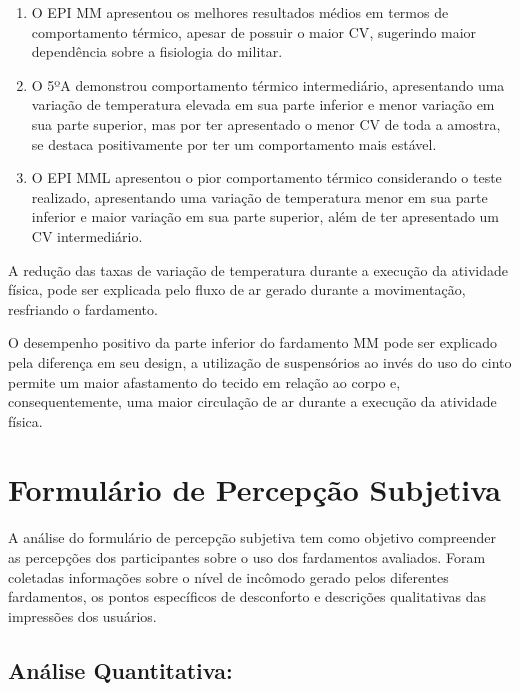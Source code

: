         \begin{enumerate}[label=\Roman*.] %
            \item O \acrshort{EPI} \acrlong{MM} apresentou os melhores resultados médios em termos de 
            comportamento térmico, apesar de possuir o maior \acrlong{CV}, sugerindo maior dependência 
            sobre a fisiologia do militar.
            \item O 5ºA demonstrou comportamento térmico intermediário, apresentando uma variação de 
            temperatura elevada em sua parte inferior e menor variação em sua parte superior, mas por 
            ter apresentado o menor \acrlong{CV} de toda a amostra, se destaca positivamente por ter 
            um comportamento mais estável.
            \item O \acrshort{EPI} \acrlong{MML} apresentou o pior comportamento térmico considerando o 
            teste realizado, apresentando uma variação de temperatura menor em 
            sua parte inferior e maior variação em sua parte superior, além de 
            ter apresentado um \acrlong{CV} intermediário.
            \end{enumerate}   
        
        A redução das taxas de variação de temperatura durante a execução da atividade física, 
        pode ser explicada pelo fluxo de ar gerado durante a movimentação, resfriando o fardamento.

        O desempenho positivo da parte inferior do fardamento \acrshort{MM} pode ser explicado pela 
        diferença em seu design, a utilização de suspensórios ao invés do uso do cinto permite um maior 
        afastamento do tecido em relação ao corpo e, consequentemente, uma maior circulação de ar 
        durante a execução da atividade física.


\section{Formulário de Percepção Subjetiva}
    A análise do formulário de percepção subjetiva tem como objetivo compreender as percepções dos 
    participantes sobre o uso dos fardamentos avaliados. Foram coletadas informações sobre o nível de 
    incômodo gerado pelos diferentes fardamentos, os pontos específicos de desconforto e descrições 
    qualitativas das impressões dos usuários.

    \subsection{Análise Quantitativa:}
        
